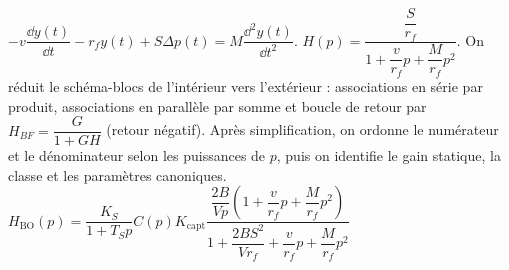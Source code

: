 \begin{corrigebox}[Corrigé]
$-v \dfrac{\dd y(t)}{\dd t} - r_f y(t) + S\Delta p(t) = M \dfrac{\dd^2 y(t)}{\dd t^2}$.
$H(p)=\dfrac{\dfrac{S}{r_f}}{1+\dfrac{v}{r_f}  p +  \dfrac{M}{r_f}  p^2 }$.
On réduit le schéma-blocs de l'intérieur vers l'extérieur : associations en série par produit, associations en parallèle par somme et boucle de retour par $H_{BF}=\dfrac{G}{1+GH}$ (retour négatif). Après simplification, on ordonne le numérateur et le dénominateur selon les puissances de $p$, puis on identifie le gain statique, la classe et les paramètres canoniques.
$H_{\text{BO}}(p) = \dfrac{K_S}{1+T_S p}C(p) K_{\text{capt}} \dfrac{\dfrac{2B}{Vp}\left( 1+\dfrac{v}{r_f}  p +  \dfrac{M}{r_f}  p^2\right)}{1+\dfrac{2BS^2}{V r_f} + \dfrac{v}{r_f}  p +  \dfrac{M}{r_f}  p^2}$
\end{corrigebox}
